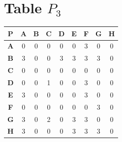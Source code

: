 \documentclass{article}
\begin{document}
\section{Table $P_{3}$}
\begin{center}
    \begin{tabular}{|c||c|c|c|c|c|c|c|c|}
        \hline
        \textbf{P} & \textbf{A} & \textbf{B} & \textbf{C} & \textbf{D} & \textbf{E} & \textbf{F} & \textbf{G} & \textbf{H} \\
        \hline
        \hline
        \textbf{A}& 0 & 0 & 0 & 0 & 0 & \cellcolor[HTML]{D74894}$3$ & 0 & 0 \\
        \hline
        \textbf{B}& \cellcolor[HTML]{D74894}$3$ & 0 & 0 & \cellcolor[HTML]{D74894}$3$ & \cellcolor[HTML]{D74894}$3$ & \cellcolor[HTML]{D74894}$3$ & \cellcolor[HTML]{D74894}$3$ & 0 \\
        \hline
        \textbf{C}& 0 & 0 & 0 & 0 & 0 & 0 & 0 & 0 \\
        \hline
        \textbf{D}& 0 & 0 & 1 & 0 & 0 & \cellcolor[HTML]{D74894}$3$ & 0 & 0 \\
        \hline
        \textbf{E}& \cellcolor[HTML]{D74894}$3$ & 0 & 0 & 0 & 0 & \cellcolor[HTML]{D74894}$3$ & 0 & 0 \\
        \hline
        \textbf{F}& 0 & 0 & 0 & 0 & 0 & 0 & \cellcolor[HTML]{D74894}$3$ & 0 \\
        \hline
        \textbf{G}& \cellcolor[HTML]{D74894}$3$ & 0 & 2 & 0 & \cellcolor[HTML]{D74894}$3$ & \cellcolor[HTML]{D74894}$3$ & 0 & 0 \\
        \hline
        \textbf{H}& \cellcolor[HTML]{D74894}$3$ & 0 & 0 & 0 & \cellcolor[HTML]{D74894}$3$ & \cellcolor[HTML]{D74894}$3$ & \cellcolor[HTML]{D74894}$3$ & 0 \\
        \hline
    \end{tabular}
\end{center}
\end{document}
